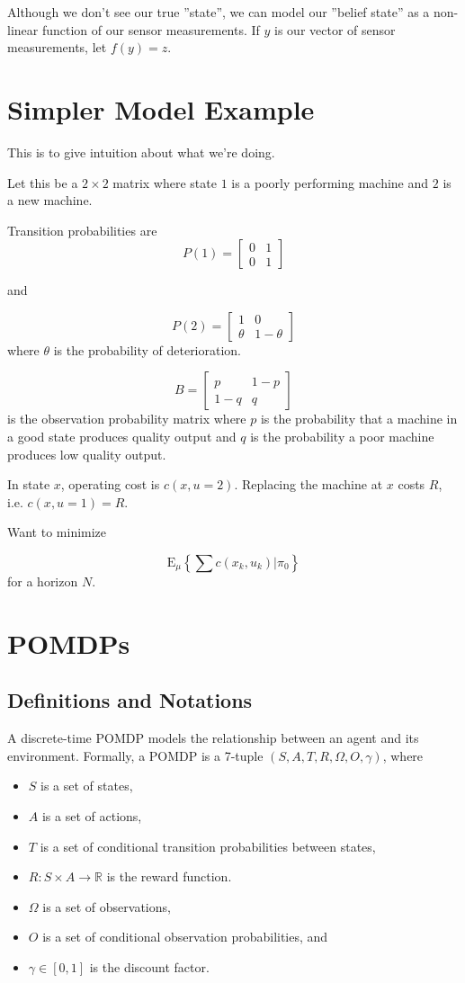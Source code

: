 \documentclass[english]{article}
\numberwithin{equation}{section}
\newcommand{\E}{\mathrm{E}}
\begin{document}
Although we don't see our true ''state'', we can model our ''belief state'' as a non-linear function of our sensor measurements. If $y$ is our vector of sensor measurements, let $f(y)=z$.

\section{Simpler Model Example}
This is to give intuition about what we're doing.

Let this be a $2\times 2$ matrix where state $1$ is a poorly performing machine and $2$ is a new machine.

Transition probabilities are
$$
P(1) = \left[ \begin{array}{cc}
0 & 1\\ 
0 & 1
\end{array} \right]
$$ 

and

$$P(2) = \left[ \begin{array}{cc}
1 & 0\\ 
\theta & 1-\theta
\end{array} \right]$$ where $\theta$ is the probability of deterioration.

$$B = \left[ \begin{array}{cc}
p & 1-p\\ 
1-q & q
\end{array} \right]$$ is the observation probability matrix where $p$ is the probability that a machine in a good state produces quality output and $q$ is the probability a poor machine produces low quality output.

In state $x$, operating cost is $c(x,u=2)$. Replacing the machine at $x$ costs $R$, i.e. $c(x,u=1)=R$.

Want to minimize

$$\E_{\mu} \left\lbrace \sum c(x_k,u_k)|\pi_0 \right\rbrace $$ for a horizon $N$.

\section{POMDPs}

\subsection{Definitions and Notations}
A discrete-time POMDP models the relationship between an agent and its environment. Formally, a POMDP is a 7-tuple $(S,A,T,R,\Omega,O,\gamma)$, where
\begin{itemize}
	\item $S$ is a set of states,
	\item $A$ is a set of actions,
	\item $T$ is a set of conditional transition probabilities between states,
	\item $R: S \times A \to \mathbb{R}$ is the reward function.
	\item $\Omega$ is a set of observations,
	\item $O$ is a set of conditional observation probabilities, and
	\item $\gamma \in [0, 1]$ is the discount factor.
\end{itemize}
\end{document}
